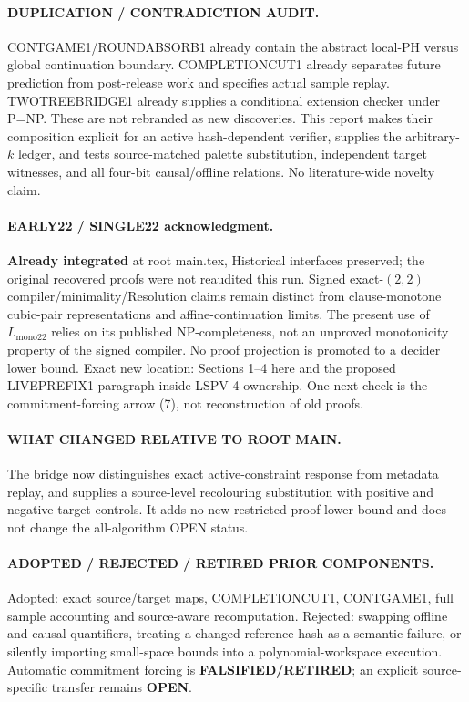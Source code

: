 \documentclass[11pt]{article}
\begin{document}
\paragraph{DUPLICATION / CONTRADICTION AUDIT.}
CONTGAME1/ROUNDABSORB1 already contain the abstract local-PH versus global
continuation boundary. COMPLETIONCUT1 already separates future prediction
from post-release work and specifies actual sample replay. TWOTREEBRIDGE1
already supplies a conditional extension checker under P=NP. These are not
rebranded as new discoveries. This report makes their composition explicit
for an active hash-dependent verifier, supplies the arbitrary-$k$ ledger,
and tests source-matched palette substitution, independent target witnesses,
and all four-bit causal/offline relations. No literature-wide novelty claim.

\paragraph{EARLY22 / SINGLE22 acknowledgment.}
\textbf{Already integrated} at root main.tex, Historical interfaces preserved;
the original recovered proofs were not reaudited this run. Signed exact-$(2,2)$
compiler/minimality/Resolution claims remain distinct from clause-monotone
cubic-pair representations and affine-continuation limits. The present use of
$L_{\mathrm{mono22}}$ relies on its published NP-completeness, not an
unproved monotonicity property of the signed compiler. No proof projection
is promoted to a decider lower bound. Exact new location: Sections 1--4 here
and the proposed LIVEPREFIX1 paragraph inside LSPV-4 ownership. One next
check is the commitment-forcing arrow (7), not reconstruction of old proofs.

\paragraph{WHAT CHANGED RELATIVE TO ROOT MAIN.}
The bridge now distinguishes exact active-constraint response from metadata
replay, and supplies a source-level recolouring substitution with positive
and negative target controls. It adds no new restricted-proof lower bound
and does not change the all-algorithm OPEN status.

\paragraph{ADOPTED / REJECTED / RETIRED PRIOR COMPONENTS.}
Adopted: exact source/target maps, COMPLETIONCUT1, CONTGAME1, full sample
accounting and source-aware recomputation. Rejected: swapping offline and
causal quantifiers, treating a changed reference hash as a semantic failure,
or silently importing small-space bounds into a polynomial-workspace
execution. Automatic commitment forcing is \textbf{FALSIFIED/RETIRED}; an
explicit source-specific transfer remains \textbf{OPEN}.
\end{document}

